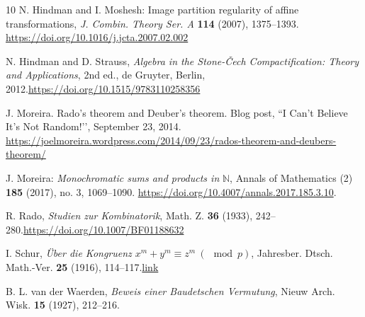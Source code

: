 \documentclass{article}
\theoremstyle{Theorem}
\theoremstyle{definition}
\begin{document}
\begin{thebibliography}{10}
 N. Hindman and I. Moshesh: Image partition regularity of affine transformations, \emph{J. Combin. Theory Ser. A} \textbf{114} (2007), 1375–1393.\href{ https://doi.org/10.1016/j.jcta.2007.02.002 }{ https://doi.org/10.1016/j.jcta.2007.02.002 }

 N. Hindman and D. Strauss, \textit{Algebra in the Stone-\v{C}ech Compactification: Theory and Applications}, 2nd ed., de Gruyter, Berlin, 2012.\href{https://doi.org/10.1515/9783110258356 }{https://doi.org/10.1515/9783110258356 }

J. Moreira.
\newblock Rado’s theorem and Deuber’s theorem.
\newblock Blog post, ``I Can’t Believe It’s Not Random!’’, September 23, 2014.
\newblock \url{https://joelmoreira.wordpress.com/2014/09/23/rados-theorem-and-deubers-theorem/}

 J. Moreira: \textit{Monochromatic sums and products in} $\mathbb{N}$, {Annals of Mathematics (2)} \textbf{185} (2017), no. 3, 1069–1090. \href{https://doi.org/10.4007/annals.2017.185.3.10}{https://doi.org/10.4007/annals.2017.185.3.10}.

 R. Rado, \textit{Studien zur Kombinatorik}, Math. Z. \textbf{36} (1933), 242–280.\href{https://doi.org/10.1007/BF01188632}{https://doi.org/10.1007/BF01188632}

 I. Schur, \textit{\"{U}ber die Kongruenz $x^{m}+y^{m}\equiv z^{m}~(\!\!\!\!\mod p)$}, Jahresber. Dtsch. Math.-Ver. \textbf{25} (1916), 114–117.\href{http://eudml.org/doc/145475}{link} 

 B. L. van der Waerden, \textit{Beweis einer Baudetschen Vermutung}, Nieuw Arch. Wisk. \textbf{15} (1927), 212–216.

\end{thebibliography}
\end{document}
